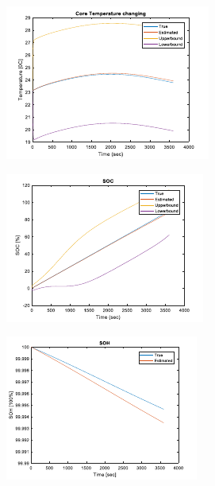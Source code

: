 \documentclass[12pt]{article}
\begin{document}
\begin{figure}[H]
\begin{subfigure}[t]{0.3\linewidth}
		\includegraphics[width=\linewidth]{figures/estVTpar3.pdf}
	\end{subfigure}
	\begin{subfigure}[t]{0.3\linewidth}
		\includegraphics[width=\linewidth]{figures/estVTpar4.pdf}
	\end{subfigure}	
	\begin{subfigure}[t]{0.3\linewidth}
		\includegraphics[width=\linewidth]{figures/estVTpar5.pdf}

\end{subfigure}
\end{figure}
\end{document}

